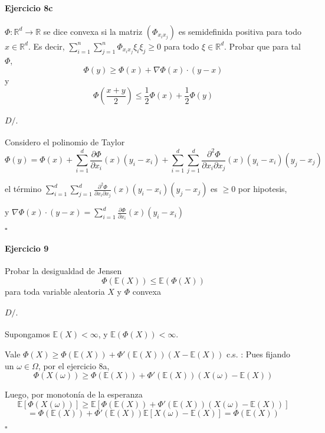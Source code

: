 \documentclass[10pt,a4paper]{article}
\newcommand{\R}{ \mathbb R }
\newcommand{\E}{ \mathbb E }
\newenvironment{ejercicio}[3]
{
	\paragraph{Ejercicio #1}
	#2
	\paragraph{$D/.$}
	#3
	$\square$
}{
}
\begin{document}
\begin{ejercicio}{8c}{
	$\Phi: \R^d \to \R$	se dice convexa si la matriz $(\Phi_{x_i x_j})$ es semidefinida positiva para todo $x \in \R^d$.
	Es decir, $\sum_{i=1}^n \sum_{j=1}^n \Phi_{x_i x_j} \xi_i \xi_j \ge 0$ para todo $\xi \in \R^d$.
	Probar que para tal $\Phi$,
	$$
		\Phi(y) \ge \Phi(x) + \nabla\Phi(x) \cdot (y-x)
	$$
	y
	$$
		\Phi(\frac{x+y}{2}) \le \frac{1}{2}\Phi(x) + \frac{1}{2}\Phi(y)
	$$
}{
	Considero el polinomio de Taylor
	$$
		\Phi(y) = \Phi(x)
		+ \sum_{i=1}^d \frac {\partial \Phi}{\partial x_i}(x) (y_i - x_i)
		+ \sum_{i=1}^d \sum_{j=1}^d \frac{\partial^2 \Phi}{\partial x_i \partial x_j}(x) (y_i - x_i) (y_j - x_j)
	$$

	el t\'ermino $\sum_{i=1}^d \sum_{j=1}^d \frac{\partial^2 \Phi}{\partial x_i \partial x_j}(x) (y_i - x_i) (y_j - x_j)$ es $\ge 0$ por hipotesis,

	y $\nabla\Phi(x) \cdot (y-x) = \sum_{i=1}^d \frac {\partial \Phi}{\partial x_i}(x) (y_i - x_i)$
}
\end{ejercicio}

\begin{ejercicio}{9}{
	Probar la desigualdad de Jensen
	$$
		\Phi(\E(X)) \le \E(\Phi(X))
	$$
	para toda variable aleatoria $X$ y $\Phi$ convexa
}{
	Supongamos $\E(X) < \infty$, y $\E (\Phi(X)) < \infty$.

		Vale $ \Phi(X) \ge \Phi(\E(X)) + \Phi'(\E(X))(X - \E(X)) $ c.s. :
		Pues fijando un $\omega \in \Omega$, por el ejercicio 8a,
		$$
			\Phi(X(\omega))
			\ge
			\Phi(\E(X)) + \Phi'(\E(X)) (X(\omega) - \E(X))
		$$

		Luego, por monotonía de la esperanza
		$$
			\E[\Phi(X(\omega))]
			\ge
			\E[\Phi(\E(X)) + \Phi'(\E(X)) (X(\omega) - \E(X))]
			$$$$
			=
			\Phi(\E(X)) + \Phi'(\E(X)) \E[X(\omega) - \E(X)]
			=
			\Phi(\E(X))
		$$
}\end{ejercicio}
\end{document}
